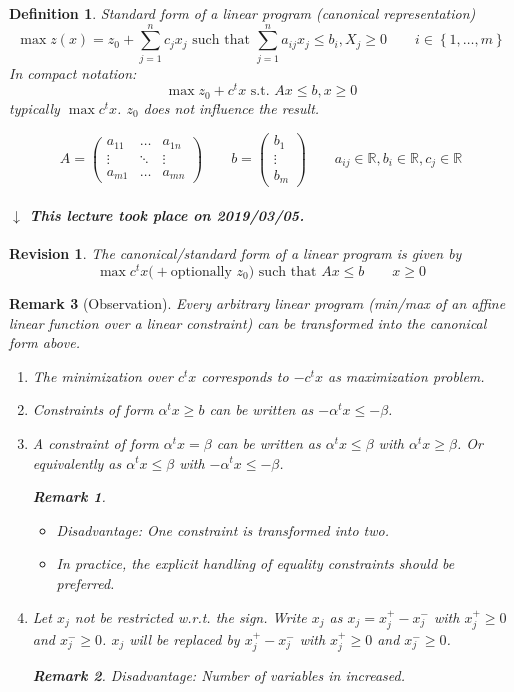 \documentclass[a4paper]{article}
\numberwithin{lecref}{section}
\newtheorem*{Definition}{Definition}
\newtheorem*{Remark}{Remark}
\newtheorem*{Revision}{Revision}
\newcommand{\Set}[1]{\left\{#1\right\}}
\newcommand{\dateref}[1]{%
  \begin{mdframed}[backgroundcolor=gray!10,innerbottommargin=0pt,innertopmargin=0pt]
    \paragraph{\textit{$\downarrow$ This lecture took place on #1.}}%
  \end{mdframed}%
}
\begin{document}
\begin{Definition}
  Standard form of a linear program (canonical representation)
  \[ \max{z(x)} = z_0 + \sum_{j=1}^n c_j x_j \text{ such that } \sum_{j=1}^n a_{ij} x_j \leq b_i, X_j \geq 0 \qquad i \in \Set{1, \dots, m} \]
  In compact notation:
  \[ \max{z_0 + c^t x} \text{ s.t. } Ax \leq b, x \geq 0 \]
  typically $\max c^t x$.
  $z_0$ does not influence the result.

  \[ A = \begin{pmatrix} a_{11} & \dots & a_{1n} \\ \vdots & \ddots & \vdots \\ a_{m1} & \dots & a_{mn} \end{pmatrix} \qquad b = \begin{pmatrix} b_1 \\ \vdots \\ b_m \end{pmatrix} \qquad a_{ij} \in \mathbb R, b_i \in \mathbb R, c_j \in \mathbb R \]
\end{Definition}

\dateref{2019/03/05}

\begin{Revision}
	The canonical/standard form of a linear program is given by
	\[ \max c^t x \text{(} + \text{optionally } z_0 \text{) such that } Ax \leq b \qquad x \geq 0 \]
\end{Revision}

\begin{Remark}[Observation]
  Every arbitrary linear program (min/max of an affine linear function over a linear constraint) can be transformed into the canonical form above.
  \begin{enumerate}
  	\item The minimization over $c^t x$ corresponds to $-c^t x$ as maximization problem.
  	\item Constraints of form $\alpha^t x \geq b$ can be written as $-\alpha^t x \leq -\beta$.
  	\item A constraint of form $\alpha^t x = \beta$ can be written as $\alpha^t x \leq \beta$ with $\alpha^t x \geq \beta$. Or equivalently as $\alpha^t x \leq \beta$ with $-\alpha^t x \leq -\beta$.
  		\begin{Remark} \hfill
	  		\begin{itemize}
	  			\item Disadvantage: One constraint is transformed into two.
	  			\item In practice, the explicit handling of equality constraints should be preferred.
	  		\end{itemize}
  		\end{Remark}
  	\item Let $x_j$ not be restricted w.r.t. the sign. Write $x_j$ as $x_j = x_j^+ - x_j^-$ with $x_j^+ \geq 0$ and $x_j^- \geq 0$.
  		$x_j$ will be replaced by $x_j^+ - x_j^-$ with $x_j^+ \geq 0$ and $x_j^- \geq 0$.
  		\begin{Remark}
  			Disadvantage: Number of variables in increased.
  		\end{Remark}
  \end{enumerate}
\end{Remark}
\end{document}
